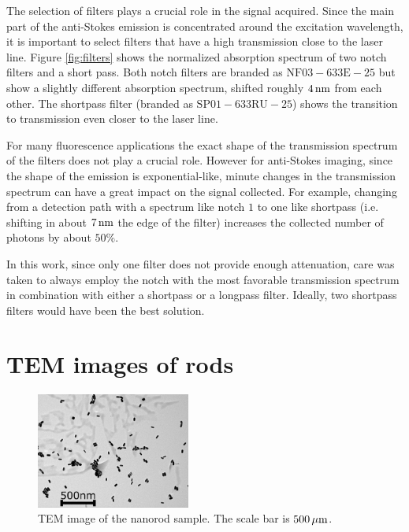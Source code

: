 The selection of filters plays a crucial role in the signal acquired. Since the
main part of the anti-Stokes emission is concentrated around the excitation
wavelength, it is important to select filters that have a high transmission
close to the laser line. Figure \ref{fig:filters} shows the normalized
absorption spectrum of two notch filters and a short pass. Both notch filters are
branded as $\textrm{NF}03-633\textrm{E}-25$ but show a slightly different
absorption spectrum, shifted roughly $4\,\textrm{nm}$ from each other. The shortpass
filter (branded as $\textrm{SP}01-633\textrm{RU}-25$) shows the transition to
transmission even closer to the laser line. 

For many fluorescence applications the exact shape of the transmission
spectrum of the filters does not play a crucial role. However for anti-Stokes
imaging, since the shape of the emission is exponential-like, minute
changes in the transmission spectrum can have a great impact on the signal collected. For example, changing from
a detection path with a spectrum like notch $1$ to one like shortpass (i.e.
shifting in about $7\,\textrm{nm}$ the edge of the filter) increases the collected number
of photons by about $50\%$. 

In this work, since only one filter does not provide enough attenuation, care was
taken to always employ the notch with the most favorable transmission spectrum
in combination with either a shortpass or a longpass filter. Ideally, two
shortpass filters would have been the best solution.

\newpage
 
\section{TEM images of rods}
 
\begin{figure}[htp]
 \centering
 \includegraphics[width=0.45\textwidth]{Chapters/03_Background_Free/Figures/Supplementary/04_TEM/tem.png}
 \caption{TEM image of the nanorod sample. The scale bar is $500\,\mu\textrm{m}$. }
 \label{fig:TEM}
 \end{figure}
 

